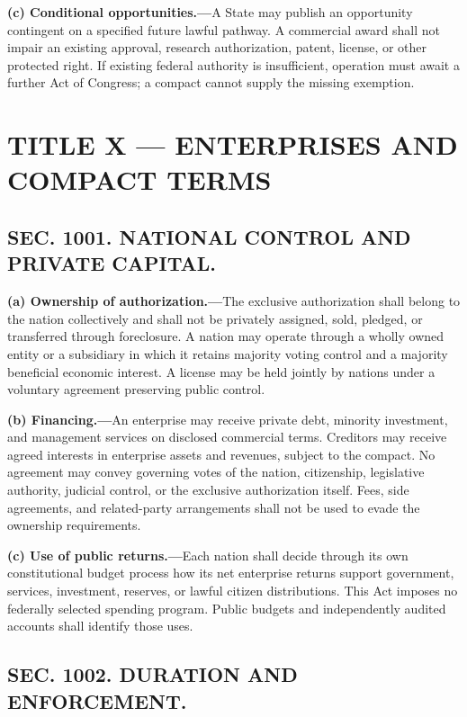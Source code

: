 \documentclass[12pt,letterpaper]{article}
\begin{document}
\textbf{(c) Conditional opportunities.---}A State may publish an opportunity contingent on a specified future lawful pathway. A commercial award shall not impair an existing approval, research authorization, patent, license, or other protected right. If existing federal authority is insufficient, operation must await a further Act of Congress; a compact cannot supply the missing exemption.

\section*{TITLE X --- ENTERPRISES AND COMPACT TERMS}

\subsection*{SEC. 1001. NATIONAL CONTROL AND PRIVATE CAPITAL.}

\textbf{(a) Ownership of authorization.---}The exclusive authorization shall belong to the nation collectively and shall not be privately assigned, sold, pledged, or transferred through foreclosure. A nation may operate through a wholly owned entity or a subsidiary in which it retains majority voting control and a majority beneficial economic interest. A license may be held jointly by nations under a voluntary agreement preserving public control.

\textbf{(b) Financing.---}An enterprise may receive private debt, minority investment, and management services on disclosed commercial terms. Creditors may receive agreed interests in enterprise assets and revenues, subject to the compact. No agreement may convey governing votes of the nation, citizenship, legislative authority, judicial control, or the exclusive authorization itself. Fees, side agreements, and related-party arrangements shall not be used to evade the ownership requirements.

\textbf{(c) Use of public returns.---}Each nation shall decide through its own constitutional budget process how its net enterprise returns support government, services, investment, reserves, or lawful citizen distributions. This Act imposes no federally selected spending program. Public budgets and independently audited accounts shall identify those uses.

\subsection*{SEC. 1002. DURATION AND ENFORCEMENT.}
\end{document}
